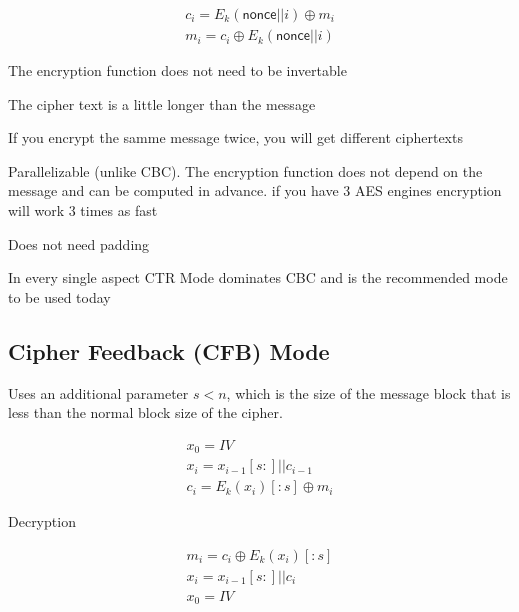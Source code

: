 \documentclass[12pt]{article}
\begin{document}
\begin{equation}
\begin{split}
c_i = E_k(\textsf{nonce}||i) \oplus m_i \\
m_i = c_i \oplus E_k(\textsf{nonce}||i)
\end{split}
\end{equation}

\begin{list}{*}{
\setlength{\itemsep}{0pt}
\setlength{\parsep}{0pt}
\setlength{\topsep}{0pt}
\setlength{\partopsep}{0pt}
\setlength{\leftmargin}{2em}
\setlength{\labelwidth}{1.5em}
\setlength{\labelsep}{0.5em}
}
\item The encryption function does not need to be invertable
\item The cipher text is a little longer than the message
\item If you encrypt the samme message twice, you will get different ciphertexts
\item Parallelizable (unlike CBC). The encryption function does not depend on the message and can be computed in advance. if you have 3 AES engines encryption will work 3 times as fast
\item Does not need padding
\item In every single aspect CTR Mode dominates CBC and is the recommended mode to be used today
\end{list}

\subsection*{Cipher Feedback (CFB) Mode}

Uses an additional parameter $s < n$, which is the size of the message block that is less than the normal block size of the cipher.

\begin{equation}
\begin{split}
x_0 = IV \\
x_i = x_{i-1}[s:]||c_{i-1} \\
c_i = E_k(x_i)[:s] \oplus m_i
\end{split}
\end{equation}

Decryption

\begin{equation}
\begin{split}
m_i = c_i \oplus E_k(x_i)[:s] \\
x_i = x_{i-1}[s:]||c_i \\
x_0 = IV
\end{split}
\end{equation}
\end{document}
